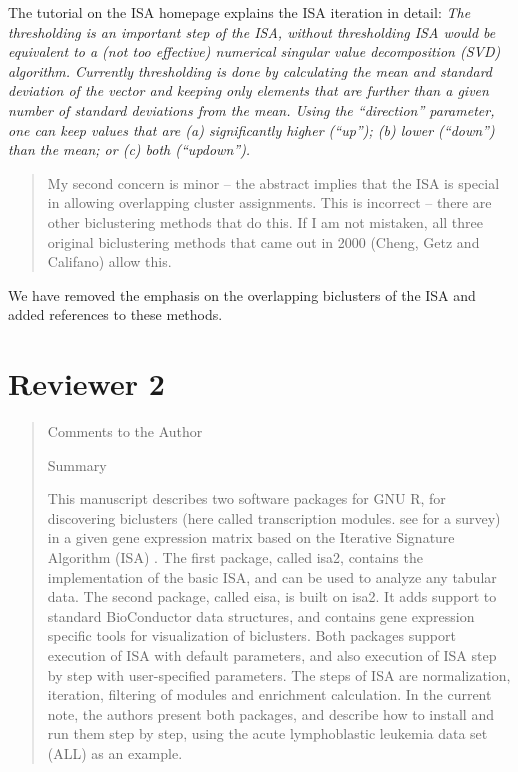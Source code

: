 \documentclass[a4paper]{article}
\begin{document}
The tutorial on the ISA homepage explains the ISA iteration in detail:
\textsl{The thresholding is an important step of the ISA, without
  thresholding ISA would be equivalent to a (not too effective)
  numerical singular value decomposition (SVD) algorithm. Currently
  thresholding is done by calculating the mean and standard deviation
  of the vector and keeping only elements that are further than a
  given number of standard deviations from the mean. Using the
  ``direction'' parameter, one can keep values that are
  (a) significantly higher (``up''); (b) lower (``down'') than the
  mean; or (c) both (``updown'').}

\begin{quote}
My second concern is minor – the abstract implies that the ISA is
special in allowing overlapping cluster assignments. This is incorrect
– there are other biclustering methods that do this. If I am not
mistaken, all three original biclustering methods that came out in
2000 (Cheng, Getz and Califano) allow this. 
\end{quote}

We have removed the emphasis on the overlapping biclusters of the
ISA and added references to these methods.

\section{Reviewer 2}

\begin{quote}
Comments to the Author

Summary

This manuscript describes two software packages for GNU R, for
discovering biclusters (here called transcription modules. see \citet{tanay05} for
a survey) in a given gene expression matrix based on the Iterative
Signature Algorithm (ISA) \citep{isa}. The first package, called isa2,
contains the implementation of the basic ISA, and can be used to
analyze any tabular data. The second package, called eisa, is built on
isa2. It adds support to standard BioConductor \citep{BioC} data structures,
and contains gene expression specific tools for visualization of
biclusters. Both packages support execution of ISA with default
parameters, and also execution of ISA step by step with user-specified
parameters. The steps of ISA are normalization, iteration, filtering
of modules and enrichment calculation. In the current note, the
authors present both packages, and describe how to install and run
them step by step, using the acute lymphoblastic leukemia data set
(ALL) \citep{chiaretti04} as an example. 
\end{quote}
\end{document}
